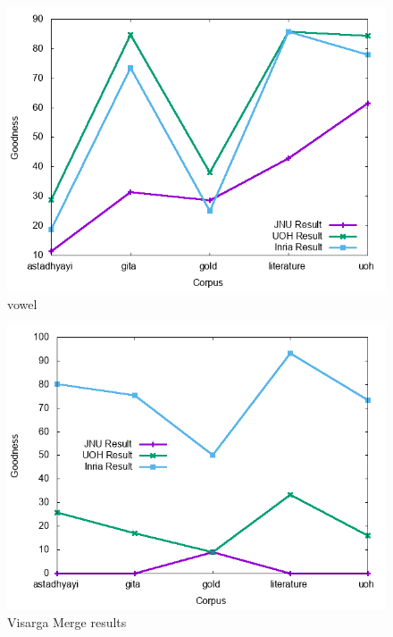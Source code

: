\documentclass[11pt]{article}
\begin{document}
\begin{figure}[h]
	\center
	\includegraphics[scale=0.34]{images/vowel.png}
	\caption{\label{screen}vowel}
\end{figure}

\begin{figure}[h]
	\center
	\includegraphics[scale=0.34]{images/visargamerge.png}
	\caption{\label{screen}Visarga Merge results}
\end{figure}
\end{document}
